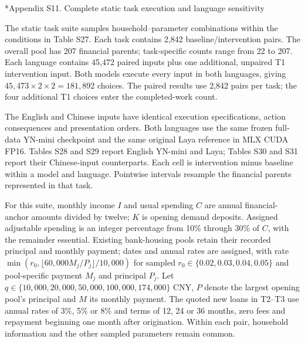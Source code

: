 \documentclass[10pt]{article}
\makeatletter
\renewcommand\section{\@startsection{section}{1}{\z@}{-2.2ex plus -1ex minus -.2ex}{.9ex plus .2ex}{\normalfont\large\mdseries}}
\makeatother
\begin{document}
\section*{Appendix S11. Complete static task execution and language sensitivity}

The static task suite samples household--parameter combinations within the conditions in Table S27. Each task contains 2,842 baseline/intervention pairs. The overall pool has 207 financial parents; task-specific counts range from 22 to 207. Each language contains 45,472 paired inputs plus one additional, unpaired T1 intervention input. Both models execute every input in both languages, giving $45,473\times2\times2=181,892$ choices. The paired results use 2,842 pairs per task; the four additional T1 choices enter the completed-work count.

The English and Chinese inputs have identical execution specifications, action consequences and presentation orders. Both languages use the same frozen full-data YN-mini checkpoint and the same original Laya reference in MLX CUDA FP16. Tables S28 and S29 report English YN-mini and Laya; Tables S30 and S31 report their Chinese-input counterparts. Each cell is intervention minus baseline within a model and language. Pointwise intervals resample the financial parents represented in that task.

For this suite, monthly income $I$ and usual spending $C$ are annual financial-anchor amounts divided by twelve; $K$ is opening demand deposits. Assigned adjustable spending is an integer percentage from 10\% through 30\% of $C$, with the remainder essential. Existing bank-housing pools retain their recorded principal and monthly payment; dates and annual rates are assigned, with rate $\min(r_0,\lfloor60,000M_j/P_j\rfloor/10,000)$ for sampled $r_0\in\{0.02,0.03,0.04,0.05\}$ and pool-specific payment $M_j$ and principal $P_j$. Let $q\in\{10,000,20,000,50,000,100,000,174,000\}$ CNY, $P$ denote the largest opening pool's principal and $M$ its monthly payment. The quoted new loans in T2--T3 use annual rates of 3\%, 5\% or 8\% and terms of 12, 24 or 36 months, zero fees and repayment beginning one month after origination. Within each pair, household information and the other sampled parameters remain common.
\end{document}
